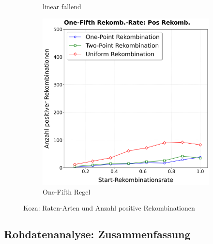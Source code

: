 \begin{figure}[H]
\begin{subfigure}[b]{0.32\textwidth}
		\caption{linear fallend}
		\label{fig:kozaPosRekombinationClegg}
	\end{subfigure}%
	\hfill
	\begin{subfigure}[b]{0.32\textwidth}
		\includegraphics[width=\textwidth]{Bilder/KozaPlotPositiveRekombinationOneFifth.png}
		\caption{One-Fifth Regel}
		\label{fig:kozaPosRekombinationOneFifth}
	\end{subfigure}
	\caption{Koza: Raten-Arten und Anzahl positive Rekombinationen}
	\label{fig:kozaPosRekombination}
\end{figure}


\subsection{Rohdatenanalyse: Zusammenfassung}
\label{subsec:rohdatenZusammenfassung}

